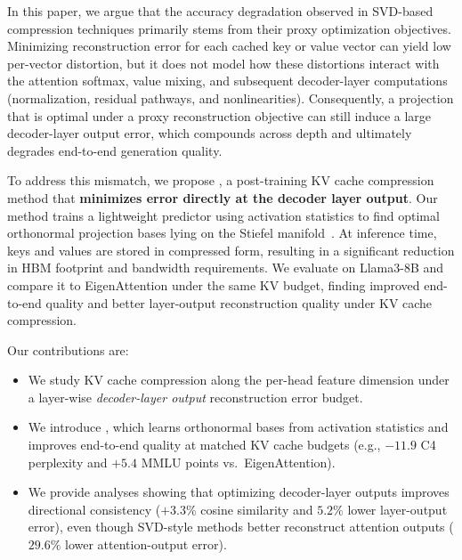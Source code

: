 In this paper, we argue that the accuracy degradation observed in SVD-based compression techniques primarily stems from their proxy optimization objectives. 
Minimizing reconstruction error for each cached key or value vector can yield low per-vector distortion, but it does not model how these distortions interact with the attention softmax, value mixing, and subsequent decoder-layer computations (normalization, residual pathways, and nonlinearities).
Consequently, a projection that is optimal under a proxy reconstruction objective can still induce a large decoder-layer output error, which compounds across depth and ultimately degrades end-to-end generation quality.

To address this mismatch, we propose \textit{\methodname}, a post-training KV cache compression method that \textbf{minimizes error directly at the decoder layer output}. Our method trains a lightweight predictor using activation statistics to find optimal orthonormal projection bases lying on the Stiefel manifold~\cite{stella}. At inference time, keys and values are stored in compressed form, resulting in a significant reduction in HBM footprint and bandwidth requirements. We evaluate {\methodname} on Llama3-8B and compare it to EigenAttention under the same KV budget, finding improved end-to-end quality and better layer-output reconstruction quality under KV cache compression.

Our contributions are:
\begin{itemize}
    \item We study KV cache compression along the per-head feature dimension under a layer-wise \emph{decoder-layer output} reconstruction error budget.
    \item We introduce \textit{\methodname}, which learns orthonormal bases from activation statistics and improves end-to-end quality at matched KV cache budgets (e.g., $-11.9$ C4 perplexity and $+5.4$ MMLU points vs.\ EigenAttention).
    \item We provide analyses showing that optimizing decoder-layer outputs improves directional consistency ($+3.3\%$ cosine similarity and $5.2\%$ lower layer-output error), even though SVD-style methods better reconstruct attention outputs ($29.6\%$ lower attention-output error).
\end{itemize}
